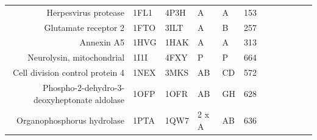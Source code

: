 \begin{table}
\begin{scriptsize}
\begin{tabular}{ r p{0.8cm} p{0.8cm} p{0.8cm} p{0.8cm} r r r r r r r }
\multicolumn{1}{r}{Herpesvirus protease} & \multicolumn{1}{l}{1FL1} & \multicolumn{1}{l}{4P3H} & \multicolumn{1}{l}{A} & \multicolumn{1}{l}{A} & 153   & \cellcolor[rgb]{ 1,  .494,  .475}  & \cellcolor[rgb]{ .573,  .816,  .314}  & \cellcolor[rgb]{ 1,  .494,  .475}  & \cellcolor[rgb]{ .573,  .816,  .314}  & \cellcolor[rgb]{ .573,  .816,  .314}  & \cellcolor[rgb]{ .573,  .816,  .314}  \\
\multicolumn{1}{r}{Glutamate receptor 2} & \multicolumn{1}{l}{1FTO} & \multicolumn{1}{l}{3ILT} & \multicolumn{1}{l}{A} & \multicolumn{1}{l}{B} & 257   & \cellcolor[rgb]{ 1,  .494,  .475}  & \cellcolor[rgb]{ 1,  .494,  .475}  & \cellcolor[rgb]{ .573,  .816,  .314}  & \cellcolor[rgb]{ 1,  .494,  .475}  & \cellcolor[rgb]{ 1,  .494,  .475}  & \cellcolor[rgb]{ 1,  .494,  .475}  \\
\multicolumn{1}{r}{Annexin A5} & \multicolumn{1}{l}{1HVG} & \multicolumn{1}{l}{1HAK} & \multicolumn{1}{l}{A} & \multicolumn{1}{l}{A} & 313   & \cellcolor[rgb]{ 1,  .494,  .475}  & \cellcolor[rgb]{ 1,  .494,  .475}  & \cellcolor[rgb]{ 1,  .494,  .475}  & \cellcolor[rgb]{ .573,  .816,  .314}  & \cellcolor[rgb]{ .573,  .816,  .314}  & \cellcolor[rgb]{ 1,  .494,  .475}  \\
\multicolumn{1}{r}{Neurolysin, mitochondrial} & \multicolumn{1}{l}{1I1I} & \multicolumn{1}{l}{4FXY} & \multicolumn{1}{l}{P} & \multicolumn{1}{l}{P} & 664   & \cellcolor[rgb]{ 1,  .494,  .475}  & \cellcolor[rgb]{ 1,  .494,  .475}  & \cellcolor[rgb]{ 1,  .494,  .475}  & \cellcolor[rgb]{ 1,  .494,  .475}  & \cellcolor[rgb]{ 1,  .494,  .475}  & \cellcolor[rgb]{ .573,  .816,  .314}  \\
\multicolumn{1}{r}{Cell division control protein 4} & \multicolumn{1}{l}{1NEX} & \multicolumn{1}{l}{3MKS} & \multicolumn{1}{l}{AB} & \multicolumn{1}{l}{CD} & 572   & \cellcolor[rgb]{ .573,  .816,  .314}  & \cellcolor[rgb]{ 1,  .494,  .475}  & \cellcolor[rgb]{ 1,  .494,  .475}  & \cellcolor[rgb]{ .573,  .816,  .314}  & \cellcolor[rgb]{ 1,  .494,  .475}  & \cellcolor[rgb]{ .573,  .816,  .314}  \\
\multicolumn{1}{r}{Phospho-2-dehydro-3-deoxyheptonate aldolase} & \multicolumn{1}{l}{1OFP} & \multicolumn{1}{l}{1OFR} & \multicolumn{1}{l}{AB} & \multicolumn{1}{l}{GH} & 628   & \cellcolor[rgb]{ 1,  .494,  .475}  & \cellcolor[rgb]{ 1,  .494,  .475}  & \cellcolor[rgb]{ 1,  .494,  .475}  & \cellcolor[rgb]{ .573,  .816,  .314}  & \cellcolor[rgb]{ 1,  .494,  .475}  & \cellcolor[rgb]{ .573,  .816,  .314}  \\
\multicolumn{1}{r}{Organophosphorus hydrolase} & \multicolumn{1}{l}{1PTA} & \multicolumn{1}{l}{1QW7} & \multicolumn{1}{l}{2 x A} & \multicolumn{1}{l}{AB} & 636   & \cellcolor[rgb]{ 1,  .494,  .475}  & \cellcolor[rgb]{ 1,  .494,  .475}  & \cellcolor[rgb]{ 1,  .494,  .475}  & \cellcolor[rgb]{ 1,  .494,  .475}  & \cellcolor[rgb]{ 1,  .494,  .475}  & \cellcolor[rgb]{ 1,  .494,  .475}  \\

\end{tabular}
\end{scriptsize}
\end{table}
